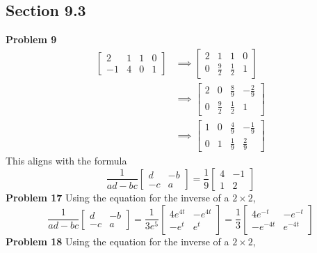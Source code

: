 \subsection*{Section 9.3}
\textbf{Problem 9}
\begin{align*}
    \begin{bmatrix}
        2 & 1 & 1 & 0 \\
        -1 & 4 & 0 & 1
    \end{bmatrix}
    &\implies \begin{bmatrix}
        2 & 1 & 1 & 0 \\
        0 & \frac{9}{2} & \frac{1}{2} & 1
    \end{bmatrix} \\
    &\implies \begin{bmatrix}
        2 & 0 & \frac{8}{9} & -\frac{2}{9} \\
        0 & \frac{9}{2} & \frac{1}{2} & 1
    \end{bmatrix} \\
    &\implies \begin{bmatrix}
        1 & 0 & \frac{4}{9} & -\frac{1}{9} \\
        0 & 1 & \frac{1}{9} & \frac{2}{9}
    \end{bmatrix} 
\end{align*}
This aligns with the formula 
\[
    \frac{1}{ad-bc}
    \begin{bmatrix}
        d & -b \\
        -c & a
    \end{bmatrix}
    = \frac{1}{9}
    \begin{bmatrix}
        4 & -1 \\
        1 & 2
    \end{bmatrix}
\]
\textbf{Problem 17}
Using the equation for the inverse of a $2 \times 2$,
\[
    \frac{1}{ad-bc}
    \begin{bmatrix}
        d & -b \\
        -c & a
    \end{bmatrix}
    = \frac{1}{3e^5}
    \begin{bmatrix}
        4e^{4t} & -e^{4t} \\
        -e^t & e^t
    \end{bmatrix}
    = \frac{1}{3}
    \begin{bmatrix}
        4e^{-t} & -e^{-t} \\
        -e^{-4t} & e^{-4t}
    \end{bmatrix}
\]
\textbf{Problem 18}
Using the equation for the inverse of a $2 \times 2$,
